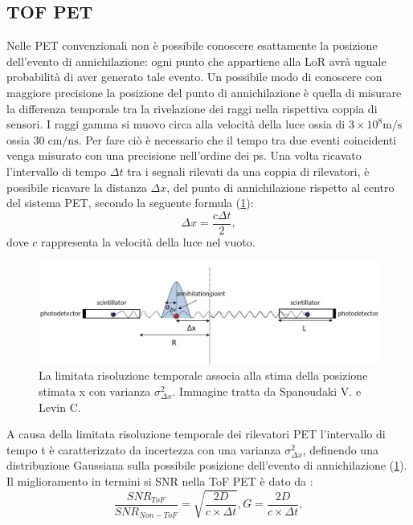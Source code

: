 \subsection{TOF PET}
Nelle PET convenzionali non è possibile conoscere esattamente la posizione dell'evento di annichilazione: ogni punto che appartiene alla LoR avrà uguale probabilità di aver generato tale evento. Un possibile modo di conoscere con maggiore precisione la posizione del punto di annichilazione è quella di misurare la differenza temporale tra la rivelazione dei raggi \textgamma nella rispettiva coppia di sensori. I raggi gamma si muovo circa alla velocità della luce ossia di $3 \times 10^8 \text{m/s}$ ossia $30  \; \text{cm/ns}$. Per fare ciò è necessario che il tempo tra due eventi coincidenti venga misurato con una precisione nell'ordine dei \unit{\pico\second}. Una volta ricavato l'intervallo di tempo $\Delta t$ tra i segnali rilevati da una coppia di rilevatori, è possibile ricavare la distanza $\Delta x$, del punto di annichilazione rispetto al centro del sistema PET, secondo la seguente formula (\Fig\ref{fig:tof_distribution})\cite{Spanoudaki2010}:
\begin{equation}
	\Delta x=\frac{c\Delta t}{2},
\end{equation}
dove $c$ rappresenta la velocità della luce nel vuoto.
\begin{figure}[tbh]
	\centering
	\includegraphics[width=\linewidth]{./ImageFiles/tof_distribution.jpg}
	\caption{La limitata risoluzione temporale associa alla stima della posizione stimata \textDelta x con varianza $\sigma^2_{\Delta x}$. Immagine tratta da Spanoudaki V. e Levin C.\cite{Spanoudaki2010}}
	\label{fig:tof_distribution}
\end{figure}
A causa della limitata risoluzione temporale dei rilevatori PET l'intervallo di tempo \textDelta t è caratterizzato da incertezza con una varianza $\sigma^2_{\Delta x}$, definendo una distribuzione Gaussiana sulla possibile posizione dell'evento di annichilazione (\Fig\ref{fig:tof_distribution}). Il miglioramento in termini si SNR nella ToF PET è dato da \cite{Jiang2019}:
\begin{equation}
	\frac{SNR_{ToF}}{SNR_{Non-ToF}}=\sqrt{\frac{2D}{c \times \Delta t}},
	G=\frac{2D}{c\times\Delta t},
\end{equation}
